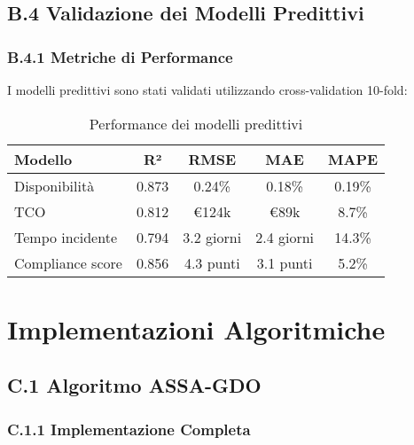 \section{B.4 Validazione dei Modelli Predittivi}

\subsection{B.4.1 Metriche di Performance}

I modelli predittivi sono stati validati utilizzando cross-validation 10-fold:

\begin{table}[htbp]
\centering
\caption{Performance dei modelli predittivi}
\begin{tabular}{|l|c|c|c|c|}
\hline
\textbf{Modello} & \textbf{R²} & \textbf{RMSE} & \textbf{MAE} & \textbf{MAPE} \\
\hline
Disponibilità & 0.873 & 0.24\% & 0.18\% & 0.19\% \\
TCO & 0.812 & €124k & €89k & 8.7\% \\
Tempo incidente & 0.794 & 3.2 giorni & 2.4 giorni & 14.3\% \\
Compliance score & 0.856 & 4.3 punti & 3.1 punti & 5.2\% \\
\hline
\end{tabular}
\end{table}

\chapter{Implementazioni Algoritmiche}
\label{app:algoritmi}

\section{C.1 Algoritmo ASSA-GDO}

\subsection{C.1.1 Implementazione Completa}

